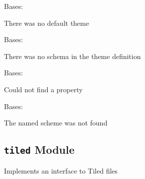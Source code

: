 \documentclass[letterpaper,10pt,english]{sphinxmanual}
\begin{document}
\begin{fulllineitems}
\begin{fulllineitems}
\begin{description}
\end{description}

\end{fulllineitems}


\end{fulllineitems}


\begin{fulllineitems}
\label{blocks:serge.blocks.themes.MissingDefault}
Bases: 

There was no default theme

\end{fulllineitems}


\begin{fulllineitems}
\label{blocks:serge.blocks.themes.MissingSchema}
Bases: 

There was no schema in the theme definition

\end{fulllineitems}


\begin{fulllineitems}
\label{blocks:serge.blocks.themes.PropertyNotFound}
Bases: 

Could not find a property

\end{fulllineitems}


\begin{fulllineitems}
\label{blocks:serge.blocks.themes.ThemeNotFound}
Bases: 

The named scheme was not found

\end{fulllineitems}



\subsection{\texttt{tiled} Module}
\label{blocks:module-serge.blocks.tiled}\label{blocks:tiled-module}
Implements an interface to Tiled files
\end{document}
